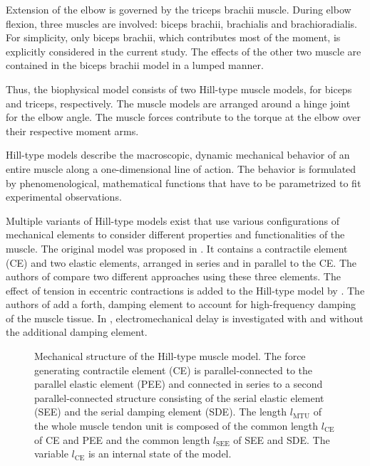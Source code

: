 Extension of the elbow is governed by the triceps brachii muscle.
During elbow flexion, three muscles are involved: biceps brachii, brachialis and brachioradialis. For simplicity, only biceps brachii, which contributes most of the moment, is explicitly considered in the current study. The effects of the other two muscle are contained in the biceps brachii model in a lumped manner.

Thus, the biophysical model consists of two Hill-type muscle models, for biceps and triceps, respectively. The muscle models are arranged around a hinge joint for the elbow angle. The muscle forces contribute to the torque at the elbow over their respective moment arms.

Hill-type models describe the macroscopic, dynamic mechanical behavior of an entire muscle along a one-dimensional line of action.
The behavior is formulated by phenomenological, mathematical functions that have to be parametrized to fit experimental observations.

Multiple variants of Hill-type models exist that use various configurations of mechanical elements to consider different properties and functionalities of the muscle. The original model was proposed in \cite{Hill1938}. It contains a contractile element (CE) and two elastic elements, arranged in series and in parallel to the CE.
The authors of \cite{Siebert2008} compare two different approaches using these three elements. The effect of tension in eccentric contractions is added to the Hill-type model by \cite{Till2008}. The authors of \cite{Gunther2007} add a forth, damping element to account for high-frequency damping of the muscle tissue. In \cite{Morl2012}, electromechanical delay is investigated with and without the additional damping element. 

\begin{figure}%
  \centering%
  \def\svgwidth{0.5\textwidth}
  \caption{Mechanical structure of the Hill-type muscle model. The force generating contractile element (CE) is parallel-connected to the parallel elastic element (PEE) and connected in series to a second parallel-connected structure consisting of the serial elastic element (SEE) and the serial damping element (SDE). The length $l_\text{MTU}$ of the whole muscle tendon unit is composed of the common length $l_\text{CE}$ of CE and PEE and the common length $l_\text{SEE}$ of SEE and SDE. The variable $l_\text{CE}$ is an internal state of the model.}
  \label{fig:hilltype}%
\end{figure}%


